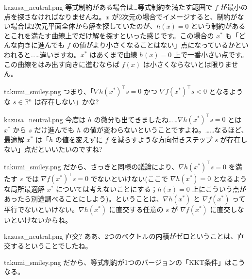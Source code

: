 \documentclass[b5paper,xelatex,ja=standard,10pt]{bxjsarticle}
\begin{document}
\begin{SERIFU}[colback=PaleIris, colbacktitle=PaleIris2]{kazusa_neutral.png}
等式制約がある場合は…等式制約を満たす範囲で $f$ が最小の点を探さなければなりませんね。$x$ が2次元の場合でイメージすると、制約がない場合は2次元平面全体から解を探していたのが、$h(x)=0$ という制約があるとこれを満たす曲線上でだけ解を探すといった感じです。この場合の $x^\ast$ も「どんな向きに進んでも $f$ の値がより小さくなることはない」点になっているかといわれると……違いますね。$x^\ast$ はあくまで曲線 $h(x)=0$ 上で一番小さい点です。この曲線をはみ出す向きに進むならば $f(x)$ は小さくならないとは限りません。
\end{SERIFU}

\begin{SERIFU}[colback=PaleGold, colbacktitle=PaleGold2]{takumi_smiley.png}
つまり、「$\nabla h(x^\ast)^\top s = 0$ かつ $\nabla f(x^\ast)^\top s < 0$ となるような $s \in \mathbb{R}^n$ は存在しない」かな?
\end{SERIFU}

\begin{SERIFU}[colback=PaleIris, colbacktitle=PaleIris2]{kazusa_neutral.png}
今度は $h$ の微分も出てきましたね……$\nabla h(x^\ast)^\top s = 0$ とは $x^\ast$ から $s$ だけ進んでも $h$ の値が変わらないということですよね。……なるほど、最適解 $x^\ast$ は「$h$ の値を変えずに $f$ を減らすような方向付きステップ $s$ が存在しない」点だといいたいのですね?
\end{SERIFU}

\begin{SERIFU}[colback=PaleGold, colbacktitle=PaleGold2]{takumi_smiley.png}
だから、さっきと同様の議論により、$\nabla h(x^\ast)^\top s = 0$ を満たす $s$ では $\nabla f(x^\ast)^\top s = 0$ でないといけない(ここで $\nabla h(x^\ast) = 0$ となるような局所最適解 $x^\ast$ については考えないことにする；$h(x) = 0$ 上にこういう点があったら別途調べることにしよう)。ということは、$\nabla h(x^\ast)$ と $\nabla f(x^\ast)$ って平行でないといけない。$\nabla h(x^\ast)$ に直交する任意の $s$ が $\nabla f(x^\ast)$ に直交しないといけないからね。
\end{SERIFU}

\begin{SERIFU}[colback=PaleIris, colbacktitle=PaleIris2]{kazusa_neutral.png}
直交? ああ、2つのベクトルの内積がゼロということは、直交するということでしたね。
\end{SERIFU}

\begin{SERIFU}[colback=PaleGold, colbacktitle=PaleGold2]{takumi_smiley.png}
だから、等式制約が1つのバージョンの「KKT条件」はこうなる。
\end{SERIFU}
\end{document}
